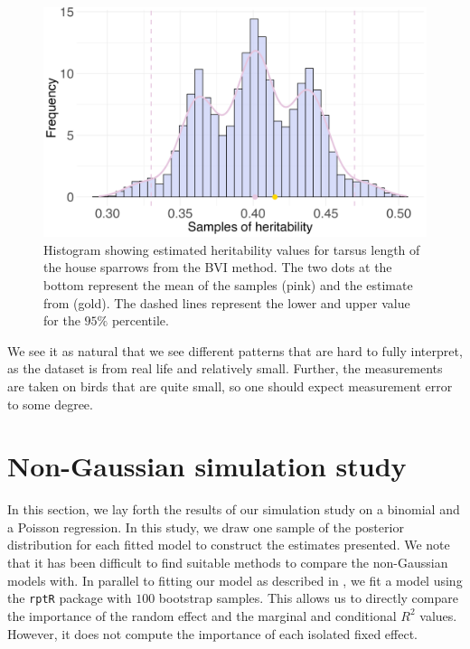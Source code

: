 \begin{figure}[!ht]%
  \centering
  \includegraphics[width=1\linewidth]{Figures/House sparrow study/Heritability_tarsus.png}
  \caption[Estimated heritability of tarsus length]{Histogram showing estimated heritability values for tarsus length of the house sparrows from the BVI method. The two dots at the bottom represent the mean of the samples (pink) and the estimate from \citep{Silva2017} (gold). The dashed lines represent the lower and upper value for the $95\%$ percentile.}
  \label{fig:heritability_tarsus}
\end{figure}
\noindent We see it as natural that we see different patterns that are hard to fully interpret, as the dataset is from real life and relatively small. Further, the measurements are taken on birds that are quite small, so one should expect measurement error to some degree.

\section{Non-Gaussian simulation study}
In this section, we lay forth the results of our simulation study on a binomial and a Poisson regression. In this study, we draw one sample of the posterior distribution for each fitted model to construct the estimates presented. We note that it has been difficult to find suitable methods to compare the non-Gaussian models with. In parallel to fitting our model as described in , we fit a model using the \texttt{rptR} package with $100$ bootstrap samples. This allows us to directly compare the importance of the random effect and the marginal and conditional $R^2$ values. However, it does not compute the importance of each isolated fixed effect.  
